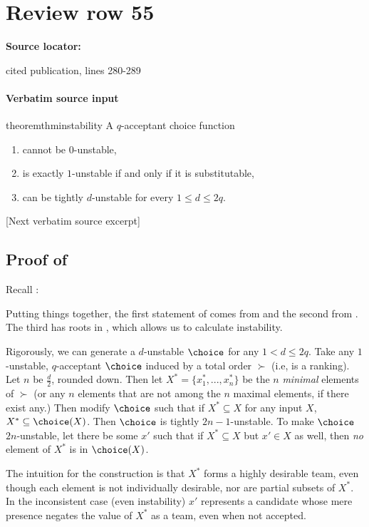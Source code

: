 \documentclass[10pt]{article}
\begin{document}
\section*{Review row 55}
\textbf{Source locator:} {\footnotesize\raggedright cited publication, lines 280-\allowbreak{}289\par}
\paragraph{Verbatim source input}
\begin{ReviewVerbatim}
\begin{restatable}{theorem}{thminstability}
\label{thm:instability}
A $q$-acceptant choice function
\begin{enumerate}
    \item cannot be $0$-unstable,
    \item  is exactly $1$-unstable if and only if it is substitutable,
    \item can be tightly $d$-unstable for every $1\leq d \leq 2q$.
\end{enumerate}

\end{restatable}%

[Next verbatim source excerpt]

\subsection{Proof of } \label{sec:instability-proof}

Recall :
\thminstability*

Putting things together, the first statement of  comes from  and the second from . The third
has roots in , which allows us to calculate instability.

Rigorously, we can generate a $d$-unstable $\choice$ for any $1 < d \leq 2q$. Take any $1$-unstable, $q$-acceptant $\choice$ induced by a total order $\succ$ (i.e, is a ranking). Let $n$ be $\frac{d}{2}$, rounded down. Then let $X^* = \{x^*_1, ..., x^*_n\}$ be the $n$ \textit{minimal} elements of $\succ$ (or any $n$ elements that are not among the $n$ maximal elements, if there exist any.) Then modify $\choice$ such that if $X^* \subseteq X$ for any input $X$, $X^* \subseteq \choice(X)$. Then $\choice$ is tightly $2n-1$-unstable. To make $\choice$ $2n$-unstable, let there be some $x'$ such that if $X^* \subseteq X$ but $x' \in X$ as well, then \textit{no} element of $X^*$ is in $\choice(X)$. %

The intuition for the construction is that $X^*$ forms a highly desirable team, even though each element is not individually desirable, nor are partial subsets of $X^*$.
In the inconsistent case (even instability) $x'$ represents a candidate whose mere presence negates the value of $X^*$ as a team, even when not accepted.
\end{ReviewVerbatim}
\end{document}
